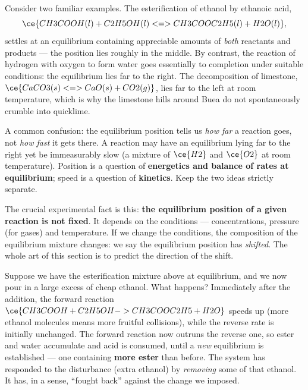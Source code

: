 \documentclass[11pt]{article}
\newcounter{popsec}
\newcounter{popsub}
\newcommand{\courssub}[1]{%
  \stepcounter{popsub}%
  \par\vspace{9pt}\noindent{\popxbold\fontsize{11.5}{13}\selectfont\color{popink}{\color{poporange}\thepopsec.\thepopsub}\hspace{6pt}#1}\par\nopagebreak\vspace{4pt}
}
\begin{document}
Consider two familiar examples. The esterification of ethanol by ethanoic acid,
\[
\ce{CH3COOH(l) + C2H5OH(l) <=> CH3COOC2H5(l) + H2O(l)},
\]
settles at an equilibrium containing appreciable amounts of \emph{both} reactants and products --- the position lies roughly in the middle. By contrast, the reaction of hydrogen with oxygen to form water goes essentially to completion under suitable conditions: the equilibrium lies far to the right. The decomposition of limestone, $\ce{CaCO3(s) <=> CaO(s) + CO2(g)}$, lies far to the left at room temperature, which is why the limestone hills around Buea do not spontaneously crumble into quicklime.

\begin{attention}
A common confusion: the equilibrium position tells us \emph{how far} a reaction goes, not \emph{how fast} it gets there. A reaction may have an equilibrium lying far to the right yet be immeasurably slow (a mixture of $\ce{H2}$ and $\ce{O2}$ at room temperature). Position is a question of \textbf{energetics and balance of rates at equilibrium}; speed is a question of \textbf{kinetics}. Keep the two ideas strictly separate.
\end{attention}

The crucial experimental fact is this: \textbf{the equilibrium position of a given reaction is not fixed}. It depends on the conditions --- concentrations, pressure (for gases) and temperature. If we change the conditions, the composition of the equilibrium mixture changes: we say the equilibrium position has \emph{shifted}. The whole art of this section is to predict the direction of the shift.

\courssub{Le Chatelier's Principle}

\begin{experience}
Suppose we have the esterification mixture above at equilibrium, and we now pour in a large excess of cheap ethanol. What happens? Immediately after the addition, the forward reaction $\ce{CH3COOH + C2H5OH -> CH3COOC2H5 + H2O}$ speeds up (more ethanol molecules means more fruitful collisions), while the reverse rate is initially unchanged. The forward reaction now outruns the reverse one, so ester and water accumulate and acid is consumed, until a \emph{new} equilibrium is established --- one containing \textbf{more ester} than before. The system has responded to the disturbance (extra ethanol) by \emph{removing} some of that ethanol. It has, in a sense, ``fought back'' against the change we imposed.
\end{experience}
\end{document}
